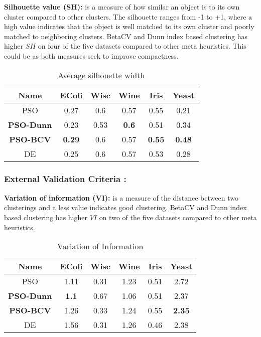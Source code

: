 \documentclass{svproc}
\begin{document}
\textbf{Silhouette value (SH): } is a measure of how similar an object is to its own cluster compared to other clusters. The silhouette ranges from -1 to +1, where a high value indicates that the object is well matched to its own cluster and poorly matched to neighboring clusters. BetaCV and Dunn index based clustering has higher $SH$ on four of the five datasets compared to other meta heuristics. This could be as both measures seek to improve compactness.  

\begin{table}[H]
\caption{Average silhouette width}
\label{asw}
\centering
\begin{tabular}{||c|c|c|c|c|c||}
  \hline
\multicolumn{1}{|c|}{\textbf{Name}} & \multicolumn{1}{c|}{\textbf{EColi}} & \multicolumn{1}{c|}{\textbf{Wisc}} & \multicolumn{1}{c|}{\textbf{Wine}} & \multicolumn{1}{c|}{\textbf{Iris}} & \multicolumn{1}{c|}{\textbf{Yeast}}\\
  \hline\hline
   PSO & 0.27 & 0.6 & 0.57 & 0.55 & 0.21 \\ [0.5ex]
   \hline
   \textbf{PSO-Dunn} & 0.23 & 0.53 & \textbf{0.6} & 0.51 & 0.34 \\
   \hline
  \textbf{PSO-BCV} & \textbf{0.29} & 0.6 & 0.57 & \textbf{0.55} & \textbf{0.48} \\
   \hline
  DE & 0.25 & 0.6 & 0.57 & 0.53 & 0.28 \\
   \hline

\end{tabular}
\end{table}

\subsubsection{External Validation Criteria :}

\textbf{Variation of information (VI): } is a measure of the distance between two clusterings and a less value indicates good clustering. BetaCV and Dunn index based clustering has higher $VI$ on two of the five datasets compared to other meta heuristics.

\begin{table}[H]
\caption{Variation of Information}
\label{asw}
\centering
\begin{tabular}{||c|c|c|c|c|c||}
  \hline
\multicolumn{1}{|c|}{\textbf{Name}} & \multicolumn{1}{c|}{\textbf{EColi}} & \multicolumn{1}{c|}{\textbf{Wisc}} & \multicolumn{1}{c|}{\textbf{Wine}} & \multicolumn{1}{c|}{\textbf{Iris}} & \multicolumn{1}{c|}{\textbf{Yeast}}\\
  \hline\hline
   PSO & 1.11 & 0.31 & 1.23 & 0.51 & 2.72 \\ [0.5ex]
   \hline
   \textbf{PSO-Dunn} & \textbf{1.1} & 0.67 & 1.06 & 0.51 & 2.37 \\
   \hline
  \textbf{PSO-BCV} & 1.26 & 0.33 & 1.24 & 0.55 & \textbf{2.35} \\
   \hline
  DE & 1.56 & 0.31 & 1.26 & 0.46 & 2.38 \\
   \hline
 
\end{tabular}
\end{table}
\end{document}
